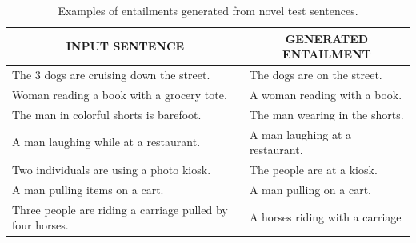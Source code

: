 \documentclass[utf8]{frontiersSCNS} %
\begin{document}
\begin{table}[!t]
\begin{center} 

\caption{Examples of entailments generated from novel test sentences.} 

\label{examples}
\vskip 0.06in
\setlength{\tabcolsep}{12pt}
\begin{tabular}{ll} 
\hline

\multicolumn{1}{c}{\rule{0pt}{3ex} INPUT SENTENCE} & 
\multicolumn{1}{c}{GENERATED ENTAILMENT} \\

\hline
\rule{0pt}{3ex}The 3 dogs are cruising down the street. & The dogs are on the street. \\
Woman reading a book with a grocery tote. & A woman reading with a book. \\
The man in colorful shorts is barefoot. & The man wearing in the shorts. \\
A man laughing while at a restaurant. & A man laughing at a restaurant. \\
Two individuals are using a photo kiosk. & The people are at a kiosk. \\
A man pulling items on a cart. & A man pulling on a cart. \\
Three people are riding a carriage pulled by four horses. & A horses riding with a carriage\\
\hline
\end{tabular}
\end{center} 
\end{table}
\end{document}
